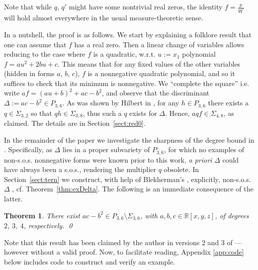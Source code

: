 \documentclass[a4paper,twoside,reqno]{amsart}
\newcommand{\RR}{\mathbb{R}}
\newcommand{\PHF}[2]{P_{{#2},{#1}}}
\newcommand{\SosHF}[2]{\Sigma_{{#2},{#1}}}
\theoremstyle{plain}
\newtheorem{thm}[prop]{Theorem}
\theoremstyle{definition}
\theoremstyle{remark}
\begin{document}
Note that while $q$, $q'$ might have some nontrivial real zeros,
the identity $f=\frac{p}{qq'}$ will hold almost everywhere in the usual measure-theoretic sense.

In a nutshell, the proof is as follows.
We start by explaining a folklore result that one can assume that $f$ has a real zero.
Then a linear change of variables allows reducing to the case where $f$ is a quadratic, w.r.t. $u:=x_1$
polynomial $f=au^2+2bu+c$. This means that for any fixed values of the
other variables (hidden in forms $a$, $b$, $c$), $f$ is a nonnegative quadratic polynomial, and so it suffices to
check that its minimum is nonnegative. We ``complete the square''
i.e. write $af=(au+b)^2+ac-b^2$, and observe that the discriminant $\Delta:=ac-b^2\in\PHF{6}{3}$.
As was shown by Hilbert  in \cite{Hilb-ternsos}, for any $h\in\PHF{6}{3}$
there exists a $q\in\SosHF{2}{3}$ so that $qh\in\SosHF{8}{3}$, thus such a $q$ exists for $\Delta$. Hence,
$aqf\in\SosHF{8}{4}$, as claimed. The details are in Section~\ref{sect:red0}.

In the remainder of the paper we investigate the sharpness of the degree
bound
in .  Specifically,
as $\Delta$ lies in a proper subvariety of $\PHF{6}{3}$, for which no examples of non-s.o.s. nonnegative
forms were known prior to this work,
\emph{a priori} $\Delta$ could have always been a s.o.s., rendering the multiplier $q$ obsolete.
In Section~\ref{sect:tern} we construct, with help of Blekherman's \cite{MR2904568}, explicitly, non-s.o.s. $\Delta$ , cf. Theorem~\ref{thm:exDelta}. 
The following is an immediate consequence of the latter.
\begin{thm}\label{thm:nonsossextic}
There exist  $ac-b^2\in\PHF{6}{3}\setminus \SosHF{6}{3}$,
with  $a,b,c\in\RR[x,y,z]$, of degrees $2$, $3$, $4$, respectively. \qed
\end{thm}
Note that this result has been claimed by the author in versions 2 and 3 of \cite{DP2022}---however without a valid proof. Now, to facilitate reading, Appendix \ref{app:code} below includes code to construct and verify an example.
\end{document}
